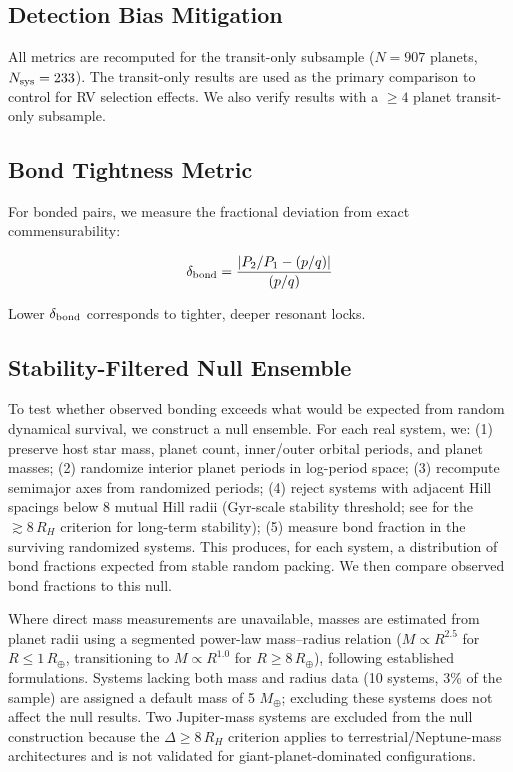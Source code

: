 \documentclass[twocolumn,usenatbib]{mnras}
\begin{document}
\subsection{Detection Bias Mitigation}

All metrics are recomputed for the transit-only subsample ($N = 907$ planets,
$N_{\rm sys} = 233$). The transit-only results are used as the primary
comparison to control for RV selection effects. We also verify results with a
$\geq 4$ planet transit-only subsample.

\subsection{Bond Tightness Metric}

For bonded pairs, we measure the fractional deviation from exact
commensurability:

\begin{equation}
\delta_{\rm bond} = \frac{|P_2/P_1 - (p/q)|}{(p/q)}
\label{eq:tightness}
\end{equation}

Lower $\delta_{\rm bond}$ corresponds to tighter, deeper resonant locks.

\subsection{Stability-Filtered Null Ensemble}

To test whether observed bonding exceeds what would be expected from random
dynamical survival, we construct a null ensemble. For each real system, we:
(1) preserve host star mass, planet count, inner/outer orbital periods, and
planet masses; (2) randomize interior planet periods in log-period space;
(3) recompute semimajor axes from randomized periods; (4) reject systems with
adjacent Hill spacings below 8 mutual Hill radii (Gyr-scale stability
threshold; see \citet{puwu2015} for the $\gtrsim 8\,R_H$ criterion for
long-term stability); (5) measure bond fraction in the surviving randomized
systems. This produces, for each system, a distribution of bond fractions
expected from stable random packing. We then compare observed bond fractions
to this null.

Where direct mass measurements are unavailable, masses are estimated from
planet radii using a segmented power-law mass--radius relation
($M \propto R^{2.5}$ for $R \leq 1\,R_\oplus$, transitioning to $M \propto
R^{1.0}$ for $R \geq 8\,R_\oplus$), following established
formulations\citep{weiss2018}. Systems lacking both mass and radius data
(10 systems, 3\% of the sample) are assigned a default mass of 5 $M_\oplus$;
excluding these systems does not affect the null results. Two Jupiter-mass
systems are excluded from the null construction because the $\Delta \geq
8\,R_H$ criterion applies to terrestrial/Neptune-mass architectures and is not
validated for giant-planet-dominated configurations.
\end{document}
